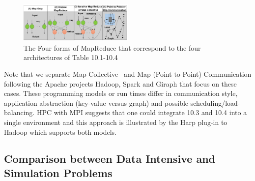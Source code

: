 \documentclass{acm_proc_article-sp}
\begin{document}
\begin{figure}
\centering
\includegraphics[width=0.5\textwidth]{mapreduce-four.png}
\caption{The Four forms of MapReduce that correspond to the four architectures of Table 10.1-10.4}
\end{figure}


Note that we separate Map-Collective~\cite{b24,b25} and Map-(Point to Point)
Communication following the Apache projects Hadoop, Spark and Giraph that focus
on these cases. These programming models or run times differ in communication
style, application abstraction (key-value versus graph) and possible
scheduling/load-balancing. HPC with MPI suggests that one could integrate 10.3
and 10.4 into a single environment and this approach is illustrated by the Harp
plug-in to Hadoop which supports both models.


\subsection{Comparison between Data Intensive and Simulation Problems}
\end{document}

